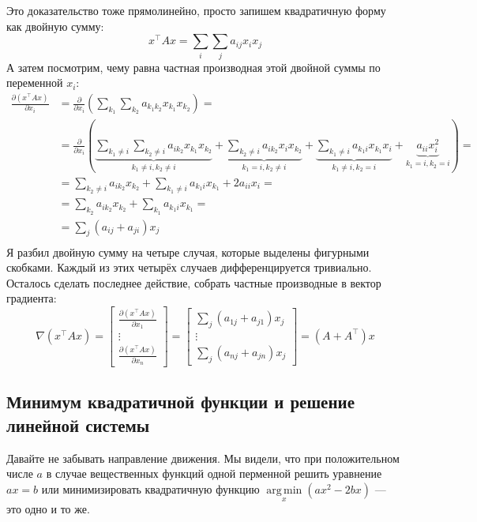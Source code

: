 \documentclass{article}
\DeclareMathOperator*{\argmin}{arg\,min}
\begin{document}
Это доказательство тоже прямолинейно, просто запишем квадратичную форму как двойную сумму:
$$x^\top A x = \sum\limits_i\sum\limits_j a_{ij} x_i x_j$$
А затем посмотрим, чему равна частная производная этой двойной суммы по переменной $x_i$:
\begin{align*}
\frac{\partial (x^\top A x)}{\partial x_i} 
&= \frac{\partial}{\partial x_i}  \left(\sum\limits_{k_1}\sum\limits_{k_2} a_{k_1 k_2} x_{k_1} x_{k_2}\right) = \\
&= \frac{\partial}{\partial x_i}  \left(
\underbrace{\sum\limits_{k_1\neq i}\sum\limits_{k_2\neq i} a_{ik_2}x_{k_1} x_{k_2}}_{k_1 \neq i, k_2 \neq i}+\underbrace{\sum\limits_{k_2\neq i} a_{ik_2}x_i x_{k_2}}_{k_1 = i, k_2\neq i}+
\underbrace{\sum\limits_{k_1\neq i} a_{k_1 i} x_{k_1} x_i}_{k_1 \neq i, k_2 = i}+
\underbrace{a_{ii}x_i^2}_{k_1 = i, k_2 = i}\right) = \\
& = \sum\limits_{k_2\neq i} a_{ik_2}x_{k_2} + \sum\limits_{k_1\neq i} a_{k_1 i} x_{k_1} + 2 a_{ii} x_i = \\
& = \sum\limits_{k_2} a_{ik_2}x_{k_2} + \sum\limits_{k_1} a_{k_1 i} x_{k_1} = \\
& = \sum\limits_{j} (a_{ij} + a_{ji}) x_j \\
\end{align*}
Я разбил двойную сумму на четыре случая, которые выделены фигурными скобками. Каждый из этих четырёх случаев дифференцируется тривиально. Осталось сделать последнее действие, собрать частные производные в вектор градиента:
$$\nabla(x^\top A x) = \begin{bmatrix}\frac{\partial (x^\top Ax)}{\partial x_1} \\ \vdots \\ \frac{\partial (x^\top A x)}{\partial x_n} \end{bmatrix}  = \begin{bmatrix}\sum\limits_{j} (a_{1j} + a_{j1}) x_j \\ \vdots \\ \sum\limits_{j} (a_{nj} + a_{jn}) x_j \end{bmatrix}  = (A+A^\top)x
$$

\subsection{Минимум квадратичной функции и решение линейной системы}
Давайте не забывать направление движения. Мы видели, что при положительном числе $a$ в случае вещественных функций одной перменной решить уравнение $ax=b$ или минимизировать квадратичную функцию $\argmin\limits_x(ax^2 - 2bx)$ --- это одно и то же.
\end{document}
